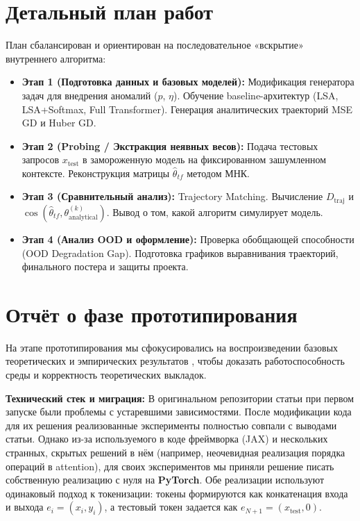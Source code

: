 \documentclass[12pt,a4paper]{article}
\begin{document}
\section{Детальный план работ}
План сбалансирован и ориентирован на последовательное «вскрытие» внутреннего алгоритма:
\begin{itemize}
    \item \textbf{Этап 1 (Подготовка данных и базовых моделей):} Модификация генератора задач для внедрения аномалий ($p$, $\eta$). Обучение baseline-архитектур (LSA, LSA+Softmax, Full Transformer). Генерация аналитических траекторий MSE GD и Huber GD.
    \item \textbf{Этап 2 (Probing / Экстракция неявных весов):} Подача тестовых запросов $x_{\text{test}}$ в замороженную модель на фиксированном зашумленном контексте. Реконструкция матрицы $\hat{\theta}_{tf}$ методом МНК.
    \item \textbf{Этап 3 (Сравнительный анализ):} Trajectory Matching. Вычисление $D_{\text{traj}}$ и $\cos(\hat{\theta}_{tf}, \theta_{\text{analytical}}^{(k)})$. Вывод о том, какой алгоритм симулирует модель.
    \item \textbf{Этап 4 (Анализ OOD и оформление):} Проверка обобщающей способности (OOD Degradation Gap). Подготовка графиков выравнивания траекторий, финального постера и защиты проекта.
\end{itemize}

\section{Отчёт о фазе прототипирования}

На этапе прототипирования мы сфокусировались на воспроизведении базовых теоретических и эмпирических результатов \cite{vonOswald2023}, чтобы доказать работоспособность среды и корректность теоретических выкладок.

\textbf{Технический стек и миграция:} В оригинальном репозитории статьи при первом запуске были проблемы с устаревшими зависимостями. После модификации кода для их решения реализованные эксперименты полностью совпали с выводами статьи. Однако из-за используемого в коде фреймворка (JAX) и нескольких странных, скрытых решений в нём (например, неочевидная реализация порядка операций в attention), для своих экспериментов мы приняли решение писать собственную реализацию с нуля на \textbf{PyTorch}. Обе реализации используют одинаковый подход к токенизации: токены формируются как конкатенация входа и выхода $e_i = (x_i, y_i)$, а тестовый токен задается как $e_{N+1} = (x_{\text{test}}, 0)$.
\end{document}
